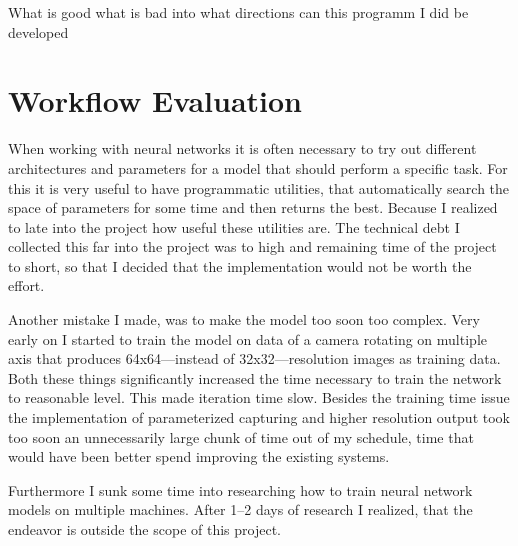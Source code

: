 What is good
what is bad
into what directions can this programm I did be developed

\section{Workflow Evaluation}
When working with neural networks it is often necessary to try out different architectures and parameters for a model that should perform a specific task. For this it is very useful to have programmatic utilities, that automatically search the space of parameters for some time and then returns the best. Because I realized to late into the project how useful these utilities are. The technical debt I collected this far into the project was to high and remaining time of the project to short, so that I decided that the implementation would not be worth the effort.

Another mistake I made, was to make the model too soon too complex. Very early on I started to train the model on data of a camera rotating on multiple axis that produces 64x64---instead of 32x32---resolution images as training data. Both these things significantly increased the time necessary to train the network to reasonable level. This made iteration time slow. Besides the training time issue the implementation of parameterized capturing and higher resolution output took too soon an unnecessarily large chunk of time out of my schedule, time that would have been better spend improving the existing systems.

Furthermore I sunk some time into researching how to train neural network models on multiple machines. After 1--2 days of research I realized, that the endeavor is outside the scope of this project.
